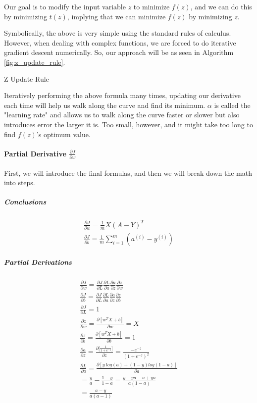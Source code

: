 \documentclass{article}
\newcommand{\myparagraph}[1]{\paragraph{#1}\mbox{}}
\newcommand{\mysubparagraph}[1]{\subparagraph{#1}\mbox{}}
\begin{document}
Our goal is to modify the input variable $z$ to minimize $f(z)$, and we can do this by minimizing $t(z)$, implying that we can minimize $f(z)$ by minimizing $z$.

Symbolically, the above is very simple using the standard rules of calculus.  However, when dealing with complex functions, we are forced to do iterative gradient descent numerically.  So, our approach will be as seen in Algorithm \ref{fig:z_update_rule}.

\begin{algorithm}[h]
\caption{Z Update Rule}
\label{fig:z_update_rule}
\end{algorithm}

Iteratively performing the above formula many times, updating our derivative each time will help us walk along the curve and find its minimum.  $\alpha$ is called the "learning rate" and allows us to walk along the curve faster or slower but also introduces error the larger it is.  Too small, however, and it might take too long to find $f(z)$'s optimum value.

\myparagraph{Partial Derivative $\frac{\partial{J}}{\partial{w}}$}

First, we will introduce the final formulas, and then we will break down the math into steps.

\mysubparagraph{Conclusions}

\begin{gather}
\frac{\partial{J}}{\partial{w}} = \frac{1}{m}X(A-Y)^{T} \\
%
\frac{\partial{J}}{\partial{b}} = \frac{1}{m} \sum_{i=1}^{m}(a^{(i)} - y^{(i)})
\end{gather}

\mysubparagraph{Partial Derivations}

\begin{gather}
\frac{\partial{J}}{\partial{w}} = \frac{\partial{J}}{\partial{L}}\frac{\partial{L}}{\partial{a}}\frac{\partial{a}}{\partial{z}}\frac{\partial{z}}{\partial{w}} \label{eqn:dJ_dw} \\
%
\frac{\partial{J}}{\partial{b}} = \frac{\partial{J}}{\partial{L}}\frac{\partial{L}}{\partial{a}}\frac{\partial{a}}{\partial{z}}\frac{\partial{z}}{\partial{b}} \label{eqn:dJ_db} \\
%
\frac{\partial{J}}{\partial{L}} = 1 \\
%
\frac{\partial{z}}{\partial{w}} = \frac{\partial{[w^TX + b]}}{\partial{w}} = X \\
%
\frac{\partial{z}}{\partial{b}} = \frac{\partial{[w^{T} X + b]}}{\partial{b}} = 1 \\
%
\frac{\partial{a}}{\partial{z}} = \frac{\partial{[\frac{1}{1 + e^{-z}}}]}{\partial{z}} = \frac{-e^{-z}}{(1+e^{-z})^{2}} \\
%
\frac{\partial{L}}{\partial{a}} = \frac{\partial{[y\ log(a) + (1-y) log (1-a)]}}{\partial{a}} \\
= \frac{y}{a} - \frac{1-y}{1-a} = \frac{y-ya-a+ya}{a(1-a)} \\
= \frac{a-y}{a(a-1)}
\end{gather}
\end{document}
